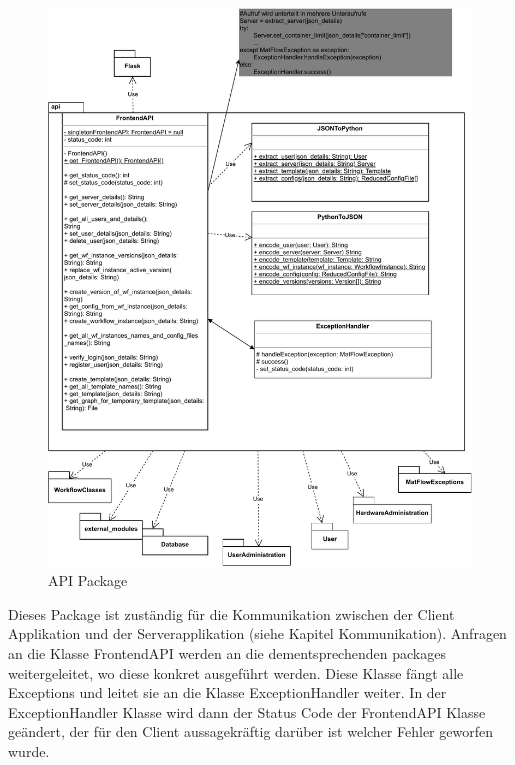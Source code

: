 \subsubsection{}
\begin{figure}[H]
    \includegraphics[width=1\textwidth]{res/api.drawio.pdf}
    \caption{API Package}
\end{figure}
Dieses Package ist zuständig für die Kommunikation zwischen der Client Applikation und der Serverapplikation (siehe Kapitel 
Kommunikation). Anfragen an die Klasse FrontendAPI werden an die dementsprechenden packages weitergeleitet, wo diese konkret 
ausgeführt werden. Diese Klasse fängt alle Exceptions und leitet sie an die Klasse ExceptionHandler weiter.
In der ExceptionHandler Klasse wird dann der Status Code der FrontendAPI Klasse geändert, der für den Client aussagekräftig
darüber ist welcher Fehler geworfen wurde.


